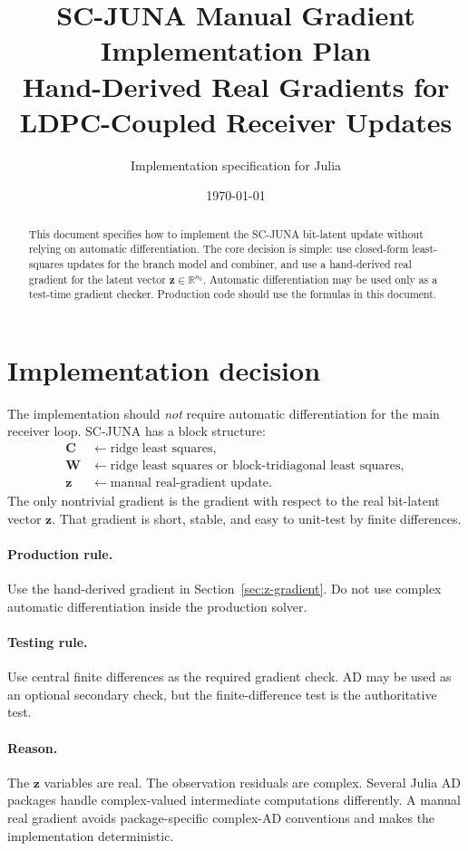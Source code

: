 \documentclass[11pt]{article}
\title{SC-JUNA Manual Gradient Implementation Plan\\
\large Hand-Derived Real Gradients for LDPC-Coupled Receiver Updates}
\author{Implementation specification for Julia}
\date{\today}
\newcommand{\R}{\mathbb{R}}
\begin{document}
\maketitle

\begin{abstract}
This document specifies how to implement the SC-JUNA bit-latent update without relying on automatic differentiation.  The core decision is simple: use closed-form least-squares updates for the branch model and combiner, and use a hand-derived real gradient for the latent vector $\bm z\in\R^{n_b}$.  Automatic differentiation may be used only as a test-time gradient checker.  Production code should use the formulas in this document.
\end{abstract}

\tableofcontents
\clearpage

\section{Implementation decision}

The implementation should \emph{not} require automatic differentiation for the main receiver loop.  SC-JUNA has a block structure:
\begin{align}
\mathbf C &\leftarrow \text{ridge least squares},\\
\mathbf W &\leftarrow \text{ridge least squares or block-tridiagonal least squares},\\
\bm z &\leftarrow \text{manual real-gradient update}.
\end{align}
The only nontrivial gradient is the gradient with respect to the real bit-latent vector $\bm z$.  That gradient is short, stable, and easy to unit-test by finite differences.

\paragraph{Production rule.}
Use the hand-derived gradient in Section~\ref{sec:z-gradient}.  Do not use complex automatic differentiation inside the production solver.

\paragraph{Testing rule.}
Use central finite differences as the required gradient check.  AD may be used as an optional secondary check, but the finite-difference test is the authoritative test.

\paragraph{Reason.}
The $\bm z$ variables are real.  The observation residuals are complex.  Several Julia AD packages handle complex-valued intermediate computations differently.  A manual real gradient avoids package-specific complex-AD conventions and makes the implementation deterministic.
\end{document}

